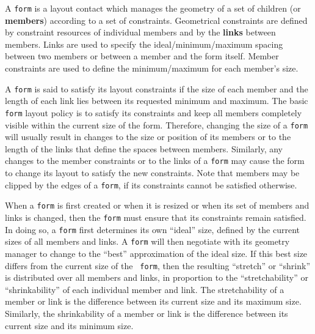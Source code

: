 

A {\tt form} is a layout contact  which manages the geometry of a
set of children (or {\bf members}) according to a set of
constraints.  Geometrical constraints are defined by constraint
resources\footnotemark{} of individual members and by the {\bf links}
between members.  Links are used to specify the ideal/minimum/maximum spacing
between two members or between a member and the form itself. Member constraints are used to define the minimum/maximum for each
member's size.


A {\tt form} is said to satisfy its layout constraints if the size of each member
and the length of each link lies between its requested minimum and maximum.  The
basic {\tt form} layout policy is to satisfy its constraints and keep all members
completely visible within the current size of the form.  Therefore, changing the
size of a {\tt form} will usually result in changes to the size or position of its
members or to the length of the links that define the spaces between members.
Similarly, any changes to the member constraints or to the links of a {\tt form}
may cause the form to change its layout to satisfy the new constraints.  Note that
members may be clipped by the edges of a {\tt form}, if its constraints cannot be
satisfied otherwise.

When a {\tt form} is first created or when it is resized or when its set of
members and links is changed, then the {\tt form} must ensure that its constraints
remain satisfied.  In doing so, a {\tt form} first determines its own ``ideal''
size, defined by the current sizes of all members and links.  A {\tt form} will
then negotiate with its geometry manager to change to the ``best'' approximation
of the ideal size.  If this best size differs from the current size of the {\tt
form}, then the resulting ``stretch'' or ``shrink'' is distributed over all
members and links, in proportion to the ``stretchability'' or ``shrinkability'' of
each individual member and link.  The stretchability of a member or link is the
difference between its current size and its maximum size.  Similarly, the
shrinkability of a member or link is the difference between its current size and
its minimum size.

